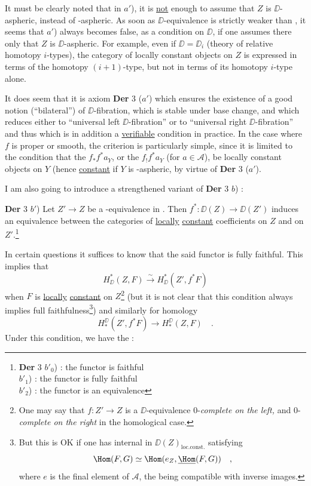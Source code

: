 It must be clearly noted that in $a'$), it is \underline{not} enough to assume that $Z$ is $\DD$-aspheric, instead of \Hot-aspheric. As soon as $\DD$-equivalence is strictly weaker than \Hot, it seems that $a'$) always becomes false, as a condition on $\DD$, if one assumes there only that $Z$ is $\DD$-aspheric. For example, even if $\DD = \DD_i$ (theory of relative homotopy $i$-types), the category
of locally constant objects on $Z$ is expressed in terms of the homotopy $(i+1)$-type, but not in terms of its homotopy $i$-type alone.

It does seem that it is axiom \textbf{Der} 3 ($a'$) which ensures the existence of a good notion (``bilateral'') of $\DD$-fibration, which is stable under base change, and which reduces either
to ``universal left $\DD$-fibration'' or to ``universal right $\DD$-fibration'' and thus which is in addition a \underline{verifiable} condition in practice. In the case where $f$ is proper or smooth, the criterion is particularly simple, since it is limited to the condition that the $f_* f^* a_Y$, or the $f_! f^* a_Y$ (for $a \in \mathcal{A}$), be locally constant objects on $Y$ (hence \underline{constant} if $Y$ is \underline{\underline{\Hot}}-aspheric, by virtue of \textbf{Der} 3 ($a'$). %

I am also going to introduce a strengthened variant of \textbf{Der} 3 $b$) :

\textbf{Der} 3 $b'$) Let $Z' \to Z$ be a \Hot-equivalence in \Dia. Then $f^* : \DD(Z) \to \DD(Z')$ induces an equivalence between the categories of \underline{locally} \underline{constant} coefficients on $Z$ and on $Z'$.\footnote[50]{\textbf{Der} 3 $b'_0$) : the functor is faithful\\
\hspace*{6em}$b'_1$) : the functor is fully faithful\\
\hspace*{6em}$b'_2$) : the functor is an equivalence} %

In certain questions it suffices to know that the said functor is fully faithful. This implies that
\[
H^*_{\DD}(Z,F) \overset{\sim}{\longrightarrow} H^*_{\DD}(Z', f^*F)
\]
when $F$ is \underline{locally} \underline{constant} on $Z$\footnote[51]{One may say that $f : Z' \to Z$ is a $\DD$-equivalence 0-\textit{complete on the left,} and 0-\textit{complete on the right} in the homological case.} (but it is not clear that this condition always implies full faithfulness\footnote[52]{But this is OK if one has internal \underline{\Hom} in $\DD(Z)_{\mathrm{loc.const.}}$ satisfying
\[
\Hom(F,G) \simeq \Hom(e_Z, \underline{\Hom}(F,G)) \quad ,
\]
where $e$ is the final element of $\mathcal{A}$, the \underline{\Hom} being compatible with inverse images.}) and similarly for homology
\[
H_*^{\DD}(Z', f^*F) \longrightarrow H_*^{\DD}(Z,F) \quad .
\]
Under this condition, we have the :

